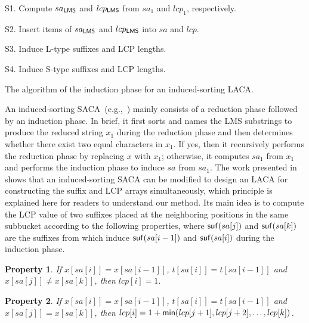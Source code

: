 \documentclass[10pt,journal,compsoc]{IEEEtran}
\newtheorem{Property}{Property}
\begin{document}
	\begin{algorithm*}
		
		\SetAlgoNoLine
		
		
		
		S1. Compute $sa_{\sf LMS}$ and $lcp_{\sf LMS}$ from $sa_1$ and $lcp_1$, respectively.
		
		S2. Insert items of $sa_{\sf LMS}$ and $lcp_{\sf LMS}$ into $sa$ and $lcp$. \label{alg:2:step:1}
		
		S3. Induce L-type suffixes and LCP lengths.
		
		S4. Induce S-type suffixes and LCP lengths.
		
		\caption{The algorithm of the induction phase for an induced-sorting LACA.}
		
		\label{alg:2}
		
	\end{algorithm*}
	
	An induced-sorting SACA~(e.g.,~\cite{Nong11}) mainly consists of a reduction phase followed by an induction phase. In brief, it first sorts and names the LMS substrings to produce the reduced string $x_1$ during the reduction phase and then determines whether there exist two equal characters in $x_1$. If yes, then it recursively performs the reduction phase by replacing $x$ with $x_1$; otherwise, it computes $sa_1$ from $x_1$ and performs the induction phase to induce $sa$ from $sa_1$. The work presented in~\cite{Fischer11} shows that an induced-sorting SACA can be modified to design an LACA for constructing the suffix and LCP arrays simultaneously, which principle is explained here for readers to understand our method. Its main idea is to compute the LCP value of two suffixes placed at the neighboring positions in the same subbucket according to the following properties, where ${\sf suf}(sa[j])$ and ${\sf suf}(sa[k])$ are the suffixes from which induce ${\sf suf}(sa[i - 1])$ and ${\sf suf}(sa[i])$ during the induction phase.
	
	\begin{Property} \label{property:1}
		If $x[sa[i]] = x[sa[i - 1]]$, $t[sa[i]] = t[sa[i - 1]]$ and $x[sa[j]] \ne x[sa[k]]$, then $lcp[i] = 1$.
		
	\end{Property}
	
	\begin{Property} \label{property:2}
		If $x[sa[i]] = x[sa[i - 1]]$, $t[sa[i]] = t[sa[i - 1]]$ and $x[sa[j]] = x[sa[k]]$, then $lcp[i] = 1 + {\sf min}(lcp[j + 1], lcp[j + 2], \dots, lcp[k])$.
		
	\end{Property}
	
\end{document}
